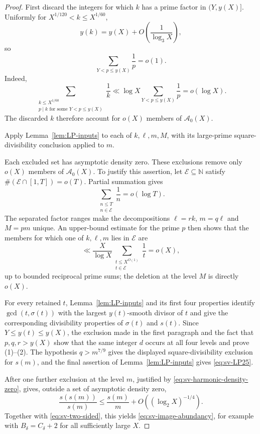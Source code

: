 \documentclass[11pt]{article}
\theoremstyle{remark}
\newcommand{\N}{\mathbb N}
\newcommand{\1}{\mathbf 1}
\begin{document}
\begin{proof}
First discard the integers for which $k$ has a prime factor in
$(Y,y(X)]$.  Uniformly for $X^{1/120}<k\leq X^{1/60}$,
\[
 y(k)=y(X)+O\!\left(\frac1{\log_3X}\right),
\]
so
\[
 \sum_{Y<p\leq y(X)}\frac1p=o(1).
\]
Indeed,
\[
 \sum_{\substack{k\leq X^{1/60}\\
       p\mid k\text{ for some }Y<p\leq y(X)}}\frac1k
 \ll \log X\sum_{Y<p\leq y(X)}\frac1p=o(\log X).
\]
The discarded $k$ therefore account for $o(X)$ members of
$\mathcal A_0(X)$.

Apply Lemma~\ref{lem:LP-inputs} to each of $k,\ell,m,M$, with its
large-prime square-divisibility conclusion applied to $m$.

Each excluded set has asymptotic density zero.  These exclusions remove only
$o(X)$ members of $\mathcal A_0(X)$.  To justify this assertion, let
$\mathcal E\subseteq\N$ satisfy
$\#(\mathcal E\cap[1,T])=o(T)$.  Partial summation gives
\begin{equation}\label{eq:sv-harmonic-density-zero}
  \sum_{\substack{n\leq T\\n\in\mathcal E}}\frac1n=o(\log T).
\end{equation}
The separated factor ranges make the decompositions
$\ell=rk$, $m=q\ell$ and $M=pm$ unique.  An upper-bound estimate for the
prime $p$ then shows that the members for which one of $k,\ell,m$ lies in
$\mathcal E$ are
\[
  \ll\frac{X}{\log X}
       \sum_{\substack{t\leq X^{O(1)}\\t\in\mathcal E}}\frac1t=o(X),
\]
up to bounded reciprocal prime sums; the deletion at the level $M$ is
directly $o(X)$.

For every retained $t$, Lemma~\ref{lem:LP-inputs} and its first four
properties identify $\gcd(t,\sigma(t))$ with the largest $y(t)$-smooth
divisor of $t$ and give the corresponding divisibility properties of
$\sigma(t)$ and $s(t)$.  Since $Y\leq y(t)\leq y(X)$, the exclusion made in
the first paragraph and the fact that $p,q,r>y(X)$ show that the same integer
$d$ occurs at all four levels and prove (1)--(2).  The hypothesis
$q>m^{7/9}$ gives the displayed square-divisibility exclusion for $s(m)$,
and the final assertion of Lemma~\ref{lem:LP-inputs} gives
\eqref{eq:sv-LP25}.

After one further exclusion at the level $m$, justified by
\eqref{eq:sv-harmonic-density-zero}, \cite[Theorem~1.4]{Pollack} gives,
outside a set of asymptotic density zero,
\[
  \frac{s(s(m))}{s(m)}
  \leq \frac{s(m)}m+O\!\left((\log_2X)^{-1/4}\right).
\]
Together with \eqref{eq:sv-two-sided}, this yields
\eqref{eq:sv-image-abundancy}, for example with $B_\delta=C_\delta+2$ for all
sufficiently large $X$.
\end{proof}
\end{document}
